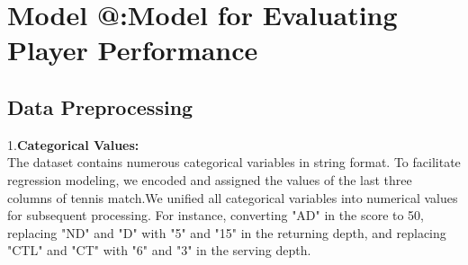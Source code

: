 \documentclass{mcmthesis}  %
\makeatletter
\newcommand{\Rmnum}[1]{\expandafter\@slowromancap\romannumeral #1@}
\makeatother
\begin{document}




\section{Model \Rmnum{1}:Model for Evaluating Player Performance}
\subsection{Data Preprocessing}

1.\textbf{Categorical Values:}\\
The dataset contains numerous categorical variables in string format. To facilitate regression modeling, we encoded and assigned the values of the last three columns of tennis match.We unified all categorical variables into numerical values for subsequent processing. For instance, converting "AD" in the score to 50, replacing "ND" and "D" with "5" and "15" in the returning depth, and replacing "CTL" and "CT" with "6" and "3" in the serving depth.\cite{ZGTK202311031139}\\
\end{document}
